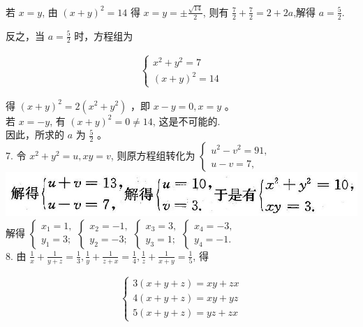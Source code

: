 \documentclass[10pt]{article}
\begin{document}
若 $x=y$, 由 $(x+y)^{2}=14$ 得 $x=y= \pm \frac{\sqrt{14}}{2}$, 则有 $\frac{7}{2}+\frac{7}{2}=2+2 a$,解得 $a=\frac{5}{2}$.

反之，当 $a=\frac{5}{2}$ 时，方程组为

\begin{align*}
\left\{\begin{array}{l}
x^{2}+y^{2}=7 \\
(x+y)^{2}=14
\end{array}\right.
\end{align*}

得 $(x+y)^{2}=2\left(x^{2}+y^{2}\right)$ ，即 $x-y=0, x=y$ 。\\
若 $x=-y$, 有 $(x+y)^{2}=0 \neq 14$, 这是不可能的.\\
因此，所求的 $a$ 为 $\frac{5}{2}$ 。\\
7. 令 $x^{2}+y^{2}=u, x y=v$, 则原方程组转化为 $\left\{\begin{array}{l}u^{2}-v^{2}=91, \\ u-v=7,\end{array}\right.$\\
\includegraphics[max width=\textwidth, center]{2024_10_30_26b590fd1106d28139f0g-143}\\
解得 $\left\{\begin{array}{l}x_{1}=1, \\ y_{1}=3 ;\end{array}\left\{\begin{array}{l}x_{2}=-1, \\ y_{2}=-3 ;\end{array}\left\{\begin{array}{l}x_{3}=3, \\ y_{3}=1 ;\end{array}\left\{\begin{array}{l}x_{4}=-3, \\ y_{4}=-1 .\end{array}\right.\right.\right.\right.$\\
8. 由 $\frac{1}{x}+\frac{1}{y+z}=\frac{1}{3}, \frac{1}{y}+\frac{1}{z+x}=\frac{1}{4}, \frac{1}{z}+\frac{1}{x+y}=\frac{1}{5}$, 得

\begin{align*}
\left\{\begin{array}{l}
3(x+y+z)=x y+z x  \tag{1}\\
4(x+y+z)=x y+y z \\
5(x+y+z)=y z+z x
\end{array}\right.
\end{align*}
\end{document}
